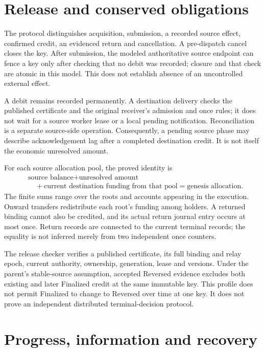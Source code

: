 \documentclass[11pt,a4paper]{article}
\begin{document}
\section{Release and conserved obligations}

The protocol distinguishes acquisition, submission, a recorded source effect,
confirmed credit, an evidenced return and cancellation. A pre-dispatch cancel
closes the key. After submission, the modeled authoritative source endpoint
can fence a key only after checking that no debit was recorded; closure and
that check are atomic in this model. This does not establish absence of an
uncontrolled external effect.

A debit remains recorded permanently. A destination delivery checks the
published certificate and the original receiver's admission and once rules;
it does not wait for a source worker lease or a local pending notification.
Reconciliation is a separate source-side operation. Consequently, a pending
source phase may describe acknowledgement lag after a completed destination
credit. It is not itself the economic unresolved amount.

For each source allocation pool, the proved identity is
\[
  \begin{aligned}
  &\text{source balance}+\text{unresolved amount}\\
  &\quad+\text{current destination funding from that pool}
    =\text{genesis allocation}.
  \end{aligned}
\]
The finite sums range over the roots and accounts appearing in the execution.
Onward transfers redistribute each root's funding among holders. A returned
binding cannot also be credited, and its actual return journal entry occurs
at most once. Return records are connected to the current terminal records;
the equality is not inferred merely from two independent once counters.

The release checker verifies a published certificate, its full binding and
relay epoch, current authority, ownership, generation, lease and versions.
Under the parent's stable-source assumption, accepted Reversed evidence
excludes both existing and later Finalized credit at the same immutable key.
This profile does not permit Finalized to change to Reversed over time at one
key. It does not prove an independent distributed terminal-decision protocol.

\section{Progress, information and recovery}
\end{document}
